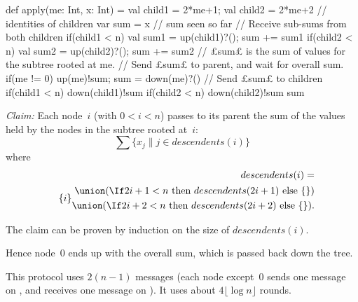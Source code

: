 \documentclass[notes,color]{sepslide0}
\def\set#1{\{#1\}}
\begin{document}

\begin{slide}

\begin{scala}
  def apply(me: Int, x: Int) = {
    val child1 = 2*me+1; val child2 = 2*me+2  // identities of children
    var sum = x                                     // sum seen so far
    // Receive sub-sums from both children
    if(child1 < n){ val sum1 = up(child1)?(); sum += sum1 }
    if(child2 < n){ val sum2 = up(child2)?(); sum += sum2 }
    // £sum£ is the sum of values for the subtree rooted at me.
    // Send £sum£ to parent, and wait for overall sum.
    if(me != 0){ up(me)!sum; sum = down(me)?() }
    // Send £sum£ to children
    if(child1 < n) down(child1)!sum
    if(child2 < n) down(child2)!sum
    sum
  }
\end{scala}
\end{slide}





\begin{slide}

\emph{Claim:} Each node~$i$ (with $0<i<n$) passes to its parent the sum of the
values held by the nodes in the subtree rooted at~$i$:
%
\[
\sum \set{x_j \| j \in descendents(i)}
\]
where
\[
\begin{align}
descendents(i) = \\
\quad
  \set{i} 
    \begin{align}
      \null \union (\If 2i+1<n \mbox{ then } descendents(2i+1) 
      \mbox{ else } \set{}) \\
      \null \union
      (\If 2i+2<n  \mbox{ then }  descendents(2i+2) \mbox{ else } \set{}).
    \end{align}
\end{align}
\]

The claim can be proven by induction on the size of $descendents(i)$.

Hence node~$0$ ends up with the overall sum, which is passed back down the
tree.
\end{slide}


\begin{slide}

This protocol uses $2(n-1)$ messages (each node except~0 sends one message on
, and receives one message on ).  It uses about
$4\lfloor \log n \rfloor$ rounds.
\end{slide}
\end{document}
